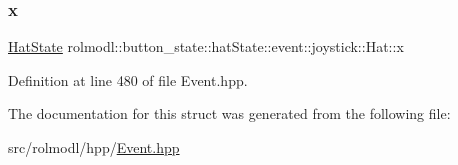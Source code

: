 \subsubsection{\texorpdfstring{x}{x}}
{\footnotesize\ttfamily \mbox{\hyperlink{structrolmodl_1_1button__state_1_1_hat_state}{Hat\+State}} rolmodl\+::button\+\_\+state\+::hat\+State\+::event\+::joystick\+::\+Hat\+::x}



Definition at line 480 of file Event.\+hpp.



The documentation for this struct was generated from the following file\+:\begin{DoxyCompactItemize}
\item 
src/rolmodl/hpp/\mbox{\hyperlink{_event_8hpp}{Event.\+hpp}}\end{DoxyCompactItemize}
